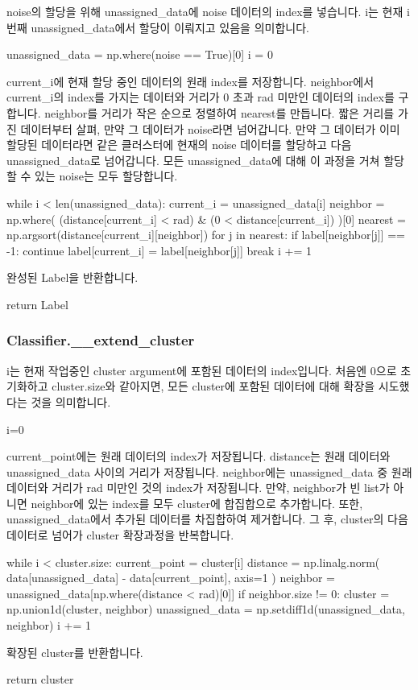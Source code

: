\documentclass{oblivoir}
\begin{document}
  noise의 할당을 위해 unassigned\_data에 noise 데이터의 index를 넣습니다.
  i는 현재 i번째 unassigned\_data에서 할당이 이뤄지고 있음을 의미합니다.
  \begin{python}[label={GPS_clustering_9}]
    unassigned_data = np.where(noise == True)[0]
    i = 0
  \end{python}
  current\_i에 현재 할당 중인 데이터의 원래 index를 저장합니다.
  neighbor에서 current\_i의 index를 가지는 데이터와 거리가 0 초과 rad 미만인 데이터의 index를 구합니다.
  neighbor를 거리가 작은 순으로 정렬하여 nearest를 만듭니다.
  짧은 거리를 가진 데이터부터 살펴, 만약 그 데이터가 noise라면 넘어갑니다.
  만약 그 데이터가 이미 할당된 데이터라면 같은 클러스터에 현재의 noise 데이터를 할당하고 다음 unassigned\_data로 넘어갑니다.
  모든 unassigned\_data에 대해 이 과정을 거쳐 할당할 수 있는 noise는 모두 할당합니다.
  \begin{python}[label={GPS_clustering_10}]
    while i < len(unassigned_data):
      current_i = unassigned_data[i]
      neighbor = np.where(
        (distance[current_i] < rad) & (0 < distance[current_i])
      )[0]
      nearest = np.argsort(distance[current_i][neighbor])
      for j in nearest:
        if label[neighbor[j]] == -1:
          continue
        label[current_i] = label[neighbor[j]]
        break
      i += 1
  \end{python}
  완성된 Label을 반환합니다.
  \begin{python}[label={GPS_clustering_11}]
    return Label
  \end{python}

  \subsubsection{Classifier.\_\_extend\_cluster}
  i는 현재 작업중인 cluster argument에 포함된 데이터의 index입니다.
  처음엔 0으로 초기화하고 cluster.size와 같아지면, 모든 cluster에 포함된 데이터에 대해 확장을 시도했다는 것을 의미합니다.
  \begin{python}[label={GPS_clustering_12}]
    i=0    
  \end{python}
  current\_point에는 원래 데이터의 index가 저장됩니다.
  distance는 원래 데이터와 unassigned\_data 사이의 거리가 저장됩니다.
  neighbor에는 unassigned\_data 중 원래 데이터와 거리가 rad 미만인 것의 index가 저장됩니다.
  만약, neighbor가 빈 list가 아니면 neighbor에 있는 index를 모두 cluster에 합집합으로 추가합니다.
  또한, unassigned\_data에서 추가된 데이터를 차집합하여 제거합니다.
  그 후, cluster의 다음 데이터로 넘어가 cluster 확장과정을 반복합니다.
  \begin{python}[label={GPS_clustering_13}]
    while i < cluster.size:
      current_point = cluster[i]
      distance = np.linalg.norm(
        data[unassigned_data] - data[current_point], axis=1
      )
      neighbor = unassigned_data[np.where(distance < rad)[0]]
      if neighbor.size != 0:
        cluster = np.union1d(cluster, neighbor)
        unassigned_data = np.setdiff1d(unassigned_data, neighbor)
      i += 1
  \end{python}
  확장된 cluster를 반환합니다.
  \begin{python}[label={GPS_clustering_14}]
    return cluster    
  \end{python}
\end{document}
